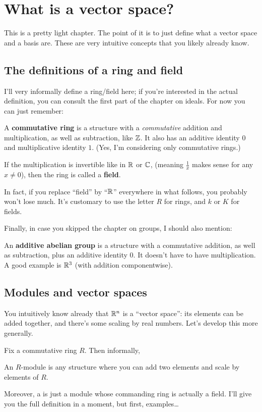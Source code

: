 \chapter{What is a vector space?}
This is a pretty light chapter.
The point of it is to just define what a vector space and a basis are.
These are very intuitive concepts that you likely already know.

\section{The definitions of a ring and field}
I'll very informally define a ring/field here; if you're interested in the actual definition,
you can consult the first part of the chapter on ideals.
For now you can just remember:
\begin{itemize}
	\ii A \textbf{commutative ring} is a structure with a \emph{commutative}
	addition and multiplication, as well as subtraction, like $\mathbb Z$. 
	It also has an additive identity $0$ and multiplicative identity $1$.
	(Yes, I'm considering only commutative rings.)

	\ii If the multiplication is invertible like in $\mathbb R$ or $\mathbb C$,
	(meaning $\frac 1x$ makes sense for any $x \neq 0$),
	then the ring is called a \textbf{field}.
\end{itemize}
In fact, if you replace ``field'' by ``$\mathbb R$'' everywhere in what follows,
you probably won't lose much.
It's customary to use the letter $R$ for rings, and $k$ or $K$ for fields.

Finally, in case you skipped the chapter on groups, I should also mention:
\begin{itemize}
	\ii An \textbf{additive abelian group} is a structure
	with a commutative addition, as well as subtraction,
	plus an additive identity $0$.
	It doesn't have to have multiplication.
	A good example is $\mathbb R^3$ (with addition componentwise).
\end{itemize}

\section{Modules and vector spaces}
You intuitively know already that $\mathbb R^n$ is a ``vector space'':
its elements can be added together,
and there's some scaling by real numbers.
Let's develop this more generally.

Fix a commutative ring $R$.
Then informally,
\begin{moral}
	An $R$-module is any structure where you can add two elements
	and scale by elements of $R$.
\end{moral}
Moreover, a  is just a module whose commanding ring
is actually a field.
I'll give you the full definition in a moment,
but first, examples\dots

